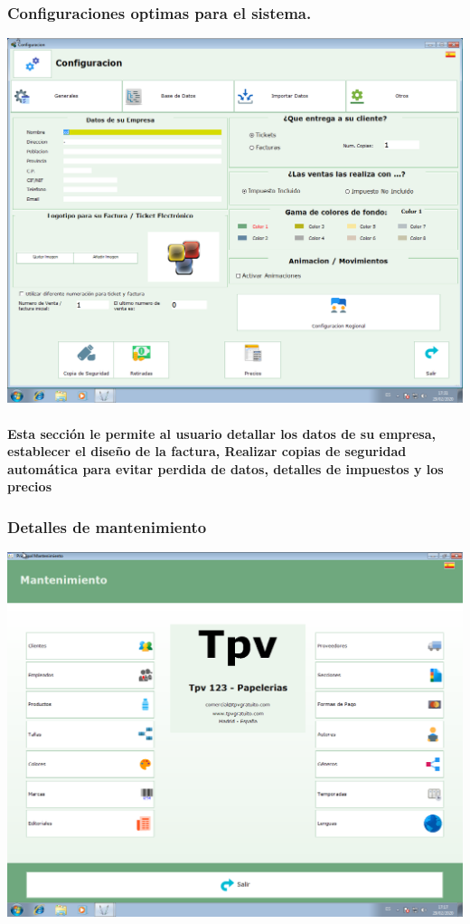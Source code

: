 \documentclass[12pt,a4paper]{ articule }
\begin{document}
\subsubsection*{Configuraciones optimas para el sistema.}
\includegraphics[scale=0.35]{Configuracion.png}
\paragraph{Esta sección le permite al usuario detallar los datos de su empresa, establecer el diseño de la factura, Realizar copias de seguridad automática para evitar perdida de datos, detalles de impuestos y los precios} 

\subsubsection*{Detalles de mantenimiento }
\includegraphics[scale=0.35]{Mantenimiento.png} 
\end{document}
